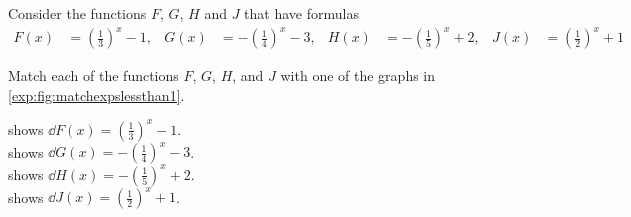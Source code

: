 \begin{exercises}
\begin{problem}\label{exp:prob:matchexpslessthan1}%
Consider the functions $F$, $G$, $H$ and $J$ that have formulas
\begin{align*}
	F(x) & =\left(\frac{1}{3}\right)^x-1, & G(x) & =-\left(\frac{1}{4}\right)^x-3, & H(x) & =-\left(\frac{1}{5}\right)^x+2, & J(x) & =\left(\frac{1}{2}\right)^x+1 
\end{align*}
\begin{subproblem}
	Match each of the functions $F$, $G$, $H$, and $J$ with one of the graphs in \cref{exp:fig:matchexpslessthan1}.
	\begin{shortsolution}
		 shows $\dd F(x)=\left(\frac{1}{3}\right)^x-1$.\\
		 shows $\dd G(x)=-\left(\frac{1}{4}\right)^x-3$.\\
		 shows $\dd H(x)=-\left(\frac{1}{5}\right)^x+2$.\\
		 shows $\dd J(x)=\left(\frac{1}{2}\right)^x+1$.
	\end{shortsolution}
\end{subproblem}
\begin{figure}[!htb]
	\begin{widepage}
	\setlength{\figurewidth}{.2\textwidth}
	\centering
	\begin{subfigure}{\figurewidth}
		\caption{}
		\label{exp:fig:matchexpsbaselt11}
	\end{subfigure}
	\hfill
	\begin{subfigure}{\figurewidth}

\end{subfigure}
\end{widepage}
\end{figure}
\end{problem}
\end{exercises}
